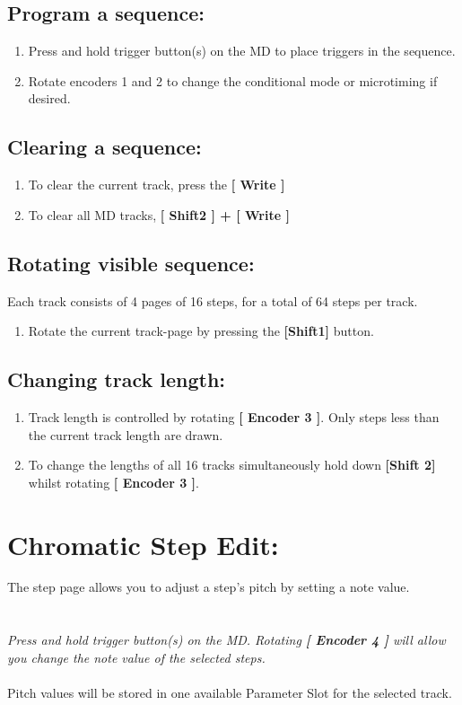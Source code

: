 \subsection{Program a sequence:}
\begin{enumerate}
\item Press and hold trigger button(s) on the MD to place triggers in the sequence.
\item Rotate encoders 1 and 2 to change the conditional mode or microtiming if desired.
\end{enumerate}
\subsection{Clearing a sequence:}
\begin{enumerate}
\item To clear the current track, press the\textbf{ [ Write ]}
\item To clear all MD tracks,  \textbf{[ Shift2 ] + [ Write ]}
\end{enumerate}
\subsection{Rotating visible sequence:}
Each track consists of 4 pages of 16 steps, for a total of 64 steps per track.
\begin{enumerate}
\item Rotate the current track-page by pressing the \textbf{[Shift1] }button.
\end{enumerate}
\subsection{Changing track length:}
\begin{enumerate}
\item Track length is controlled by rotating \textbf{[ Encoder 3 ]}. Only steps less than the current track length are drawn.
\item To change the lengths of all 16 tracks simultaneously hold down \textbf{[Shift 2]} whilst rotating \textbf{[ Encoder 3 ]}.
\end{enumerate}

\section{Chromatic Step Edit:}
The step page allows you to adjust a step's pitch by setting a note value. 
\\
\\
\\
\textit{Press and hold trigger button(s) on the MD. Rotating \textbf{[ Encoder 4 ]} will allow you change the note value of the selected steps.}\\
\\
Pitch values will be stored in one available Parameter Slot for the selected track.



